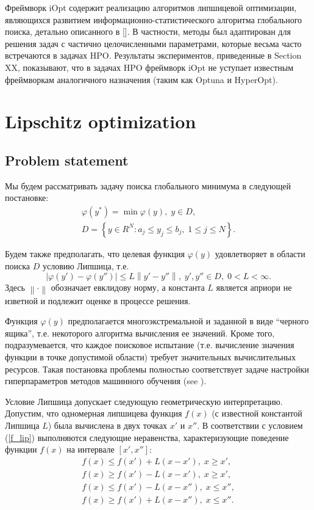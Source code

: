 \documentclass[preprint,12pt]{elsarticle}
\begin{document}
Фреймворк iOpt содержит реализацию алгоритмов липшицевой оптимизации, являющихся развитием информационно-статистического алгоритма глобального поиска, детально описанного в []. 
В частности, методы был адаптирован для решения задач с частично целочисленными параметрами, которые весьма часто встречаются в задачах HPO.
Результаты экспериментов, приведенные в Section XX, показывают, что в задачах HPO фреймворк iOpt не уступает известным фреймворкам аналогичного назначения (таким как Optuna и HyperOpt).

\section{Lipschitz optimization} 
\label{sec_lip}

\subsection{Problem statement} 

Мы будем рассматривать задачу поиска глобального минимума в следующей постановке:
\begin{gather}
	\varphi(y^*) = \min \varphi(y), \; y \in D, \label{f_func} \\
	D = \left\{y \in R^N : a_j \leq y_j \leq b_j , \; 1 \leq j \leq N \right\}. \label{f_D}
\end{gather}

Будем также предполагать, что целевая функция $\varphi(y)$ удовлетворяет в области поиска $D$ условию Липшица, т.е.
\begin{equation} \label{f_lip}
	\left| \varphi(y')-\varphi(y'') \right| \leq L\left\| y' - y''  \right\| , \; y',y'' \in D, \; 0<L<\infty.
\end{equation}
Здесь $ \left\| \cdot \right\|$ обозначает евклидову норму, а константа $L$ является априори не изветной и подлежит оценке в процессе решения. 

Функция $\varphi(y)$ предполагается многоэкстремальной и заданной в виде ``черного ящика'', т.е. некоторого алгоритма вычисления ее значений. Кроме того, подразумевается, что каждое поисковое испытание (т.е. вычисление значения функции в точке допустимой области) требует значительных вычислительных ресурсов. Такая постановка проблемы полностью соответствует задаче настройки гиперпараметров методов машинного обучения (see ).

Условие Липшица допускает следующую геометрическую интерпретацию. Допустим, что одномерная липшицева функция $f(x)$ (с известной константой Липшица $L$) была вычислена в двух точках $x'$ и $x''$. В соответствии с условием (\ref{f_lip}) выполняются следующие неравенства, характеризующие поведение функции $f(x)$ на интервале $[x', x'']$:
\begin{gather*}
	f(x) \leq f(x') + L(x-x'), \; x \geq x',\\
	f(x) \geq f(x') - L(x-x'), \; x \geq x',\\
	f(x) \leq f(x') - L(x-x''), \; x \leq x'',\\
	f(x) \geq f(x') + L(x-x''), \; x \leq x''.
\end{gather*}
\end{document}

